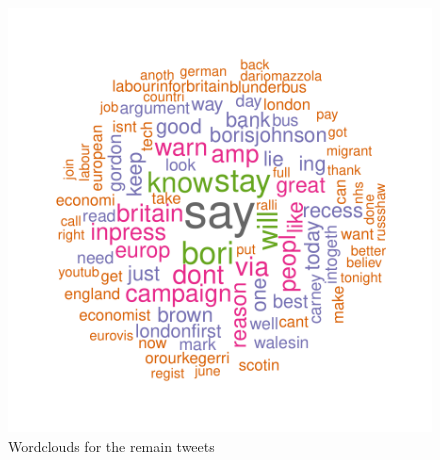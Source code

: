 \documentclass[10pt]{article}
\begin{document}
\hspace{1cm} 
\begin{figure}[H]
\begin{center}
\hspace{1cm} 
\begin{Schunk}
\end{Schunk}
\hspace{1cm} 
\includegraphics{submission-029}

\caption {Wordclouds for the remain tweets}
\label{fig10}
\end {center}
\end {figure}
\end{document}
